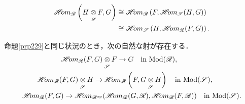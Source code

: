 \begin{leftbar}
    \begin{PRP}\label{prp229}
        \begin{align}
            \HOM_{\scR}\left(H\ttens[\scS]F,G\right)
            &\cong
            \HOM_{\scR}\left(F,\HOM_{\scS}(H,G)\right)\label{eq229}\\
            &\cong
            \HOM_{\scS}\left(H,\HOM_{\scR}(F,G)\right).\notag
        \end{align}
    \end{PRP}
\end{leftbar}
\begin{leftbar}
    \begin{CRL}
        命題\ref{prp229}と同じ状況のとき，次の自然な射が存在する．
        \begin{align}
            \HOM_{\scR}(F,G)&\ttens[\scS]F\to G\quad\text{in \(\Mod(\scR)\)},\label{eq2210}\\
            \HOM_{\scR}(F,G)\ttens[\scS]H
            \to&\HOM_{\scR}\left(F,G\ttens[\scS]H\right)
            \quad\text{in \(\Mod(\scS)\)},\label{eq2211}\\
            \HOM_{\scR}(F,G)
            \to
            \HOM_{\scR^{\op}}&(
                \HOM_{\scR}(G,\scR),\HOM_{\scR}(F,\scR)
            )\quad\text{in \(\Mod(\scS)\)}.\label{eq2212}
        \end{align}
    \end{CRL}
\end{leftbar}
